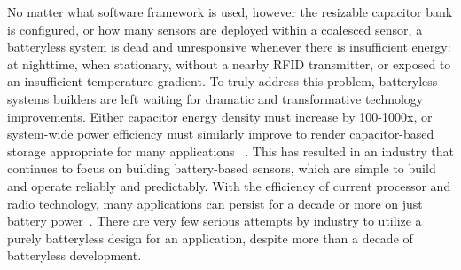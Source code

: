 No matter what software framework is used, however the resizable capacitor bank is configured, or how many sensors are deployed within a coalesced sensor, a batteryless system is dead and unresponsive whenever there is insufficient energy: at nighttime, when stationary, without a nearby RFID transmitter, or exposed to an insufficient temperature gradient.
To truly address this problem, batteryless systems builders are left waiting for dramatic and transformative technology improvements. Either capacitor energy density must increase by 100-1000x, or system-wide power efficiency must similarly improve
to render capacitor-based storage appropriate for many applications
~\cite{curtiss2021facebit}. 
This has resulted in an industry that continues to focus on building battery-based sensors, which are simple to build and operate reliably and predictably.
With the efficiency of current processor and radio technology, many applications can persist for a decade or more on just battery power~\cite{emersonRosemount,GEInsightMesh,honeywellOneWireless}.
There are very few serious attempts by industry to utilize a purely batteryless design for an application, despite more than a decade of batteryless development.

